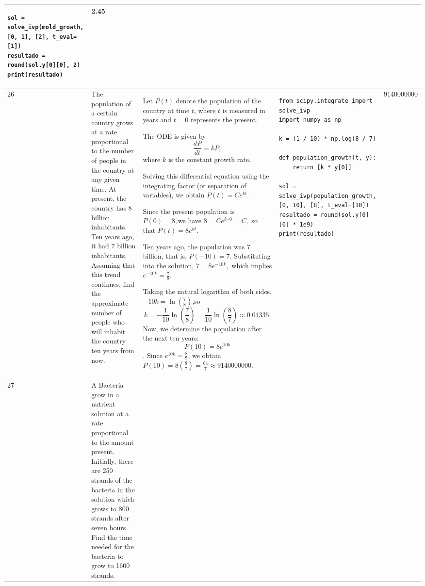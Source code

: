 \documentclass[a4paper,12pt]{article}
\begin{document}
\begin{longtable}{|p{0.3cm}|p{}|p{10cm}|p{}|p{1.5cm}|}
\begin{verbatim}
sol = solve_ivp(mold_growth, [0, 1], [2], t_eval=[1])
resultado = round(sol.y[0][0], 2)
print(resultado) \end{verbatim}& 2.45   \\ \hline 
26            &The population of a certain country grows at a rate proportional to the number of people in the country at any given time. At present, the country has \(8\) billion inhabitants. Ten years ago, it had \(7\) billion inhabitants. Assuming that this trend continues, find the approximate number of people who will inhabit the country ten years from now.


              & Let \(P(t)\) denote the population of the country at time \(t\), where \(t\) is measured in years and \(t=0\) represents the present.

The ODE is given by
\[
\frac{dP}{dt}=kP,
\]
where \(k\) is the constant growth rate.

Solving this differential equation using the integrating factor (or separation of variables), we obtain
$P(t)=Ce^{kt}.$

Since the present population is $P(0)=8,$we have $8=Ce^{k\cdot0}=C,$
so that $
P(t)=8e^{kt}.$

Ten years ago, the population was \(7\) billion, that is,
$P(-10)=7$.
Substituting into the solution, $7=8e^{-10k},$ which implies $
e^{-10k}=\frac{7}{8}.$


Taking the natural logarithm of both sides,$
-10k=\ln\left(\frac{7}{8}\right)$,so
\[
k=-\frac{1}{10}\ln\left(\frac{7}{8}\right)
=\frac{1}{10}\ln\left(\frac{8}{7}\right)
\approx0.01335.
\]
Now, we determine the population after the next ten years:
$$P(10)=8e^{10k}$$. Since $
e^{10k}=\frac{8}{7}$,  we obtain
$P(10)=8\left(\frac{8}{7}\right)
=\frac{64}{7}
\approx9140000000$. 
 &\begin{verbatim}from scipy.integrate import solve_ivp
import numpy as np

k = (1 / 10) * np.log(8 / 7)

def population_growth(t, y):
    return [k * y[0]]

sol = solve_ivp(population_growth, [0, 10], [8], t_eval=[10])
resultado = round(sol.y[0][0] * 1e9)
print(resultado)\end{verbatim}& 9140000000  \\ \hline 
 27            &A Bacteria grow in a nutrient solution at a rate proportional to the amount present. Initially, there are 250 strands of the bacteria in the solution which grows to 800 strands after seven hours. Find the time needed for the bacteria to grow to 1600 strands.



\end{longtable}
\end{document}
